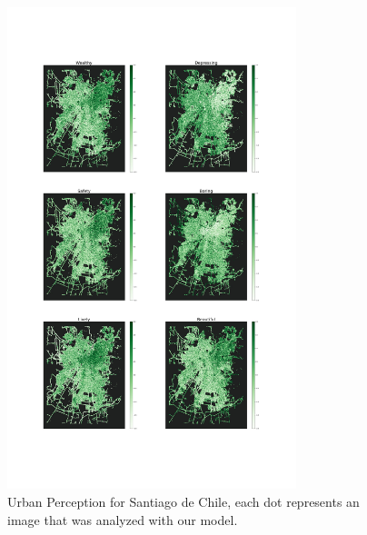 \begin{figure}[ht]
	\begin{center}
	\includegraphics[width=0.75\textwidth]{./figures/colormaps_green.jpg}
	\caption[Urban Perception for Santiago de Chile]{
        Urban Perception for Santiago de Chile, each dot represents an image that
        was analyzed with our model.
    }
	\label{fig:colormaps}
	\end{center}
\end{figure}

